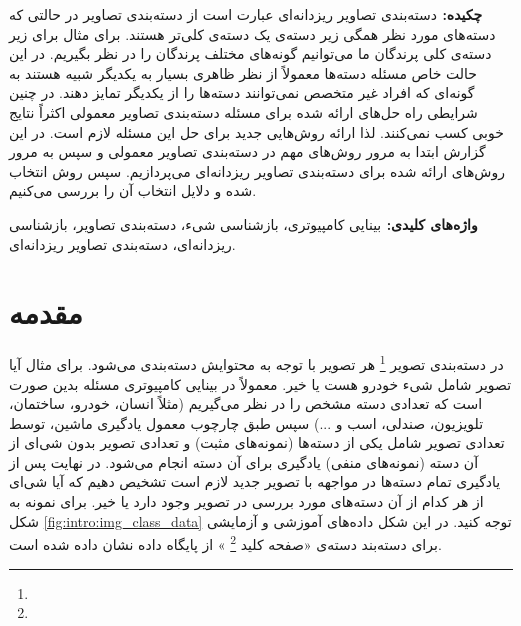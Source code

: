 \documentclass[11pt]{article}
\begin{document}

\usepackage{pifont}
\newcommand{\cmark}{\ding{51}}


{\bf {چکيده: }}
دسته‌بندی تصاویر ریزدانه‌ای عبارت است از دسته‌بندی تصاویر در حالتی که دسته‌های مورد نظر همگی زیر دسته‌ی یک دسته‌ی کلی‌تر هستند. برای مثال برای زیر دسته‌ی کلی پرندگان ما می‌توانیم گونه‌های مختلف پرندگان را در نظر بگیریم. در این حالت خاص مسئله دسته‌ها معمولاً از نظر ظاهری بسیار به یکدیگر شبیه هستند به گونه‌ای که افراد غیر متخصص نمی‌توانند دسته‌ها را از یکدیگر تمایز دهند. در چنین شرایطی راه حل‌های ارائه شده برای مسئله دسته‌بندی تصاویر معمولی اکثراً نتایج خوبی کسب نمی‌کنند. لذا ارائه روش‌هایی جدید برای حل این مسئله لازم است.
در این گزارش ابتدا به مرور روش‌های مهم در دسته‌بندی تصاویر معمولی و سپس به مرور روش‌های ارائه شده برای دسته‌بندی تصاویر ریزدانه‌ای می‌پردازیم. سپس روش انتخاب شده و دلایل انتخاب آن را بررسی می‌کنیم.


{\bf  { واژه‌های کلیدی: }}
بینایی کامپیوتری، بازشناسی شیء، دسته‌بندی تصاویر، بازشناسی ریزدانه‌ای، دسته‌بندی تصاویر ریزدانه‌ای.

\setlength{\parindent}{0.25in} %

\section{مقدمه}\label{sec:intro}
در دسته‌بندی تصویر 
\footnote{}
هر تصویر با توجه به محتوایش دسته‌بندی می‌شود. برای مثال آیا تصویر شامل شی‌ء خودرو هست یا خیر. معمولاً در بینایی کامپیوتری مسئله بدین صورت است که تعدادی دسته مشخص را در نظر می‌گیریم (مثلاً انسان، خودرو، ساختمان، تلویزیون، صندلی، اسب و ...) سپس طبق چارچوب معمول یادگیری ماشین، توسط تعدادی تصویر شامل یکی از دسته‌ها (نمونه‌های مثبت) و تعدادی تصویر بدون شی‌ای از آن دسته (نمونه‌های منفی) یادگیری برای آن دسته انجام می‌شود. در نهایت پس از یادگیری تمام دسته‌ها در مواجهه با تصویر جدید لازم است تشخیص دهیم که آیا شی‌ای از هر کدام از آن دسته‌های مورد بررسی در تصویر وجود دارد یا خیر.
برای نمونه به شکل
\ref{fig:intro:img_class_data}
توجه کنید. در این شکل داده‌های آموزشی و آزمایشی برای دسته‌بند دسته‌ی «صفحه کلید
\footnote{}
» از پایگاه داده
 \cite{caltech256}
 نشان داده شده است.
\end{document}
